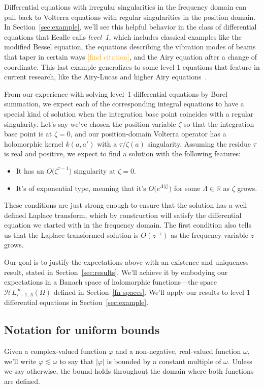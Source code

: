 \documentclass{article}
\theoremstyle{plain}
\newcommand{\R}{\mathbb{R}}
\newcommand{\singexp}[2]{\mathcal{H}L^\infty_{#1, #2}}
\newcommand{\domain}{\Omega}
\begin{document}
Differential equations with irregular singularities in the frequency domain can pull back to Volterra equations with regular singularities in the position domain. In Section~\ref{sec:example}, we'll see this helpful behavior in the class of differential equations that Ecalle calls {\em level~1}, which includes classical examples like the modified Bessel equation, the equations describing the vibration modes of beams that taper in certain ways \textcolor{orange}{[find citation]}, and the Airy equation after a change of coordinate. This last example generalizes to some level 1 equations that feature in current research, like the Airy-Lucas and higher Airy equations~\cite[Equations 3.2 and 3.8]{charbonnier22}\cite{durugo_higher}.

From our experience with solving level~1 differential equations by Borel summation, we expect each of the corresponding integral equations to have a special kind of solution when the integration base point coincides with a regular singularity. Let's say we've chosen the position variable $\zeta$ so that the integration base point is at $\zeta = 0$, and our position-domain Volterra operator has a holomorphic kernel $k(a, a')$ with a $\tau/\zeta(a)$ singularity. Assuming the residue $\tau$ is real and positive, we expect to find a solution with the following features:
\begin{itemize}
\item It has an $O\big(\zeta^{\tau-1}\big)$ singularity at $\zeta = 0$.
\item It's of exponential type, meaning that it's $O\big(e^{\Lambda|\zeta|}\big)$ for some $\Lambda \in \R$ as $\zeta$ grows.
\end{itemize}
These conditions are just strong enough to ensure that the solution has a well-defined Laplace transform, which by construction will satisfy the differential equation we started with in the frequency domain. The first condition also tells us that the Laplace-transformed solution is $O(z^{-\tau})$ as the frequency variable $z$ grows.

Our goal is to justify the expectations above with an existence and uniqueness result, stated in Section~\ref{sec:results}. We'll achieve it by embodying our expectations in a Banach space of holomorphic functions---the space $\singexp{\tau-1}{\Lambda}(\domain)$ defined in Section~\ref{fn-spaces}. We'll apply our results to level $1$ differential equations in Section~\ref{sec:example}.
\subsection{Notation for uniform bounds}
Given a complex-valued function $\varphi$ and a non-negative, real-valued function $\omega$, we'll write $\varphi \lesssim \omega$ to say that $|\varphi|$ is bounded by a constant multiple of $\omega$. Unless we say otherwise, the bound holds throughout the domain where both functions are defined.
\end{document}
